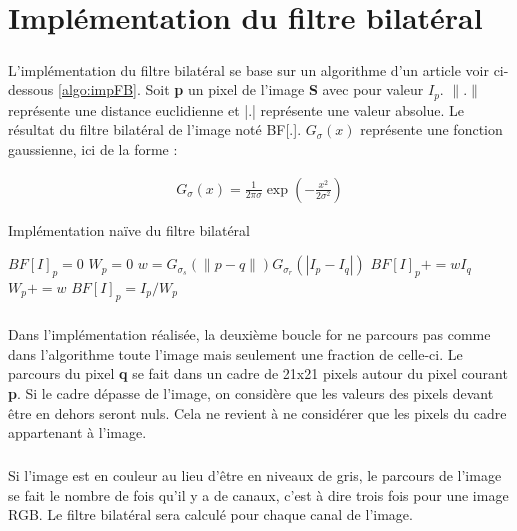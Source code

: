 \documentclass[twoside,UTF8]{EPURapport}
\begin{document}
\chapter{Implémentation du filtre bilatéral}

\paragraph{}
L'implémentation du filtre bilatéral se base sur un algorithme d'un article  \cite{filtreBilateral} voir ci-dessous \ref{algo:impFB}. Soit \textbf{p} un pixel de l'image \textbf{S} avec pour valeur \textbf{$I_{p}$}. $\|.\|$ représente une distance euclidienne et |.| représente une valeur absolue. Le résultat du filtre bilatéral de l'image noté BF[.]. $G_{\sigma}(x)$ représente une fonction gaussienne, ici de la forme : 

\begin{align}
	G_{\sigma}(x) = \frac{1}{2\pi \sigma} \exp(-\frac{x^2}{2\sigma^2})
\end{align}

\begin{algorithm}[H]
\caption{Implémentation naïve du filtre bilatéral}
\label{algo:impFB}
\begin{algorithmic}[1]
	\STATE $BF[I]_p =0$
	\STATE $W_p = 0$
		\STATE $w = G_{\sigma_s}(\|p-q\|)G_{\sigma_r}(|I_p-I_q|)  $
		\STATE $BF[I]_p += wI_q$
		\STATE $W_p += w$
	\ENDFOR
	\STATE $BF[I]_p = I_p / W_p$
\ENDFOR

\end{algorithmic}
\end{algorithm}

\paragraph{}
Dans l'implémentation réalisée, la deuxième boucle for ne parcours pas comme dans l'algorithme toute l'image mais seulement une fraction de celle-ci. Le parcours du pixel \textbf{q} se fait dans un cadre de 21x21 pixels autour du pixel courant \textbf{p}. Si le cadre dépasse de l'image, on considère que les valeurs des pixels devant être en dehors seront nuls. Cela ne revient à ne considérer que les pixels du cadre appartenant à l'image. 

\paragraph{}
Si l'image est en couleur au lieu d'être en niveaux de gris, le parcours de l'image se fait le nombre de fois qu'il y a de canaux, c'est à dire trois fois pour une image RGB. Le filtre bilatéral sera calculé pour chaque canal de l'image. 
\end{document}
